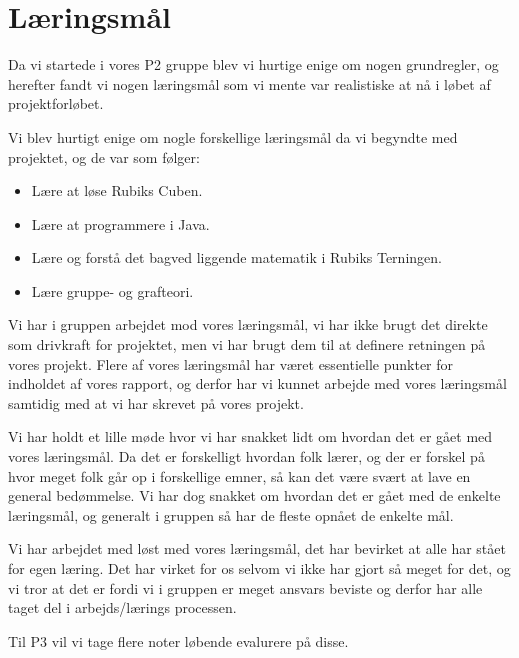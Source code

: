 \section{L\ae{}ringsm\aa{}l}
Da vi startede i vores P2 gruppe blev vi hurtige enige om nogen grundregler, og herefter fandt vi nogen l\ae{}ringsm\aa{}l som vi mente var realistiske at n\aa{} i l\o{}bet af projektforl\o{}bet.

Vi blev hurtigt enige om nogle forskellige l\ae{}ringsm\aa{}l da vi begyndte med projektet, og de var som f\o{}lger:

\begin{itemize}
\item L\ae{}re at l\o{}se Rubiks Cuben.
\item L\ae{}re at programmere i Java.
\item L\ae{}re  og forst\aa{} det bagved liggende matematik i Rubiks Terningen. 
\item L\ae{}re gruppe- og grafteori.
\end{itemize}

Vi har i gruppen arbejdet mod vores l\ae{}ringsm\aa{}l, vi har ikke brugt det direkte som drivkraft for projektet, men vi har brugt dem til at definere retningen p\aa{} vores projekt.
Flere af vores l\ae{}ringsm\aa{}l har v\ae{}ret essentielle punkter for indholdet af vores rapport, og derfor har vi kunnet arbejde med vores l\ae{}ringsm\aa{}l samtidig med at vi har skrevet p\aa{} vores projekt.

Vi har holdt et lille m\o{}de hvor vi har snakket lidt om hvordan det er g\aa{}et med vores l\ae{}ringsm\aa{}l. Da det er forskelligt hvordan folk l\ae{}rer, og der er forskel p\aa{} hvor meget folk g\aa{}r op i forskellige emner, s\aa{} kan det v\ae{}re sv\ae{}rt at lave en general bed\o{}mmelse. Vi har dog snakket om hvordan det er g\aa{}et med de enkelte l\ae{}ringsm\aa{}l, og generalt i gruppen s\aa{} har de fleste opn\aa{}et de enkelte m\aa{}l.

Vi har arbejdet med l\o{}st med vores l\ae{}ringsm\aa{}l, det har bevirket at alle har st\aa{}et for egen l\ae{}ring. Det har virket for os selvom vi ikke har gjort s\aa{} meget for det, og vi tror at det er fordi vi i gruppen er meget ansvars beviste og derfor har alle taget del i arbejds/l\ae{}rings processen.

Til P3 vil vi tage flere noter l\o{}bende evalurere p\aa{} disse.

